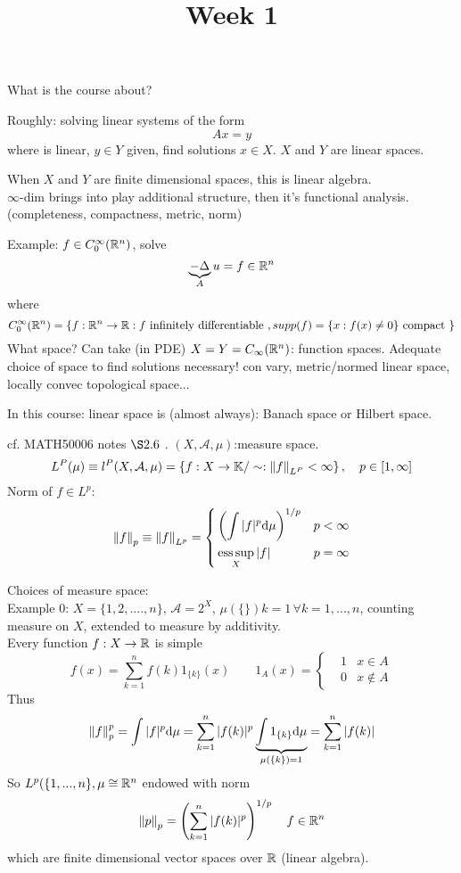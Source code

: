 \documentclass{article}
\title{Week 1}
\author{\aut}
\begin{document}
\maketitle

What is the course about?

Roughly: solving linear systems of the form 
$$Ax=y$$  
where  is linear, $y\in Y$ given, find solutions $x\in X$. $X$ and $Y$ are linear spaces.
\begin{remark}
    When $X$ and $Y$ are finite dimensional spaces, this is linear algebra.\\
    $\infty$-dim brings into play additional structure, then it's functional analysis. (completeness, compactness, metric, norm)
\end{remark}


Example: $f\in C_0^\infty (\mathbb{R}^n)$, solve
$$
\underbrace{-\Delta}_A u=f\in\mathbb{R}^n
$$where
$$
C_0^\infty(\mathbb{R}^n)=\left\{
f:\mathbb{R}^n\to\mathbb{R}:f\text{ infinitely differentiable }, supp(f)=\{x:f(x)\neq0\} \text{ compact }
\right\}
$$
What space?
Can take (in PDE) $X=Y=C_\infty(\mathbb{R}^n)$: function spaces.
Adequate choice of space to find solutions necessary!
con vary, metric/normed linear space, locally convec topological space...

In this course: linear space is (almost always): Banach space or Hilbert space.
\begin{example}
cf. MATH50006 notes $\S2.6$ .
$(X,\mathcal{A},\mu)$:measure space.
$$
L^P(\mu)\equiv l^P(X,\mathcal{A},\mu)=
\left\{
f:X\to\mathbb{K}/\sim:\left\|{f}\right\|_{L^P}<\infty
\right\},\quad p\in[1,\infty]
$$
Norm of $f\in L^p$:
$$
\left\|{f}\right\|_p\equiv\left\|{f}\right\|_{L^p}=
\left\{
\begin{aligned}
    &\left(\int|f|^p{\rm d}\mu\right)^{1/p} &p<
    \infty\\
    & \operatorname*{ess\,sup}_X |f| &p=\infty
\end{aligned}\right.
$$
\end{example}


Choices of measure space:\\
Example 0: $X=\{1,2,....,n\}$, $\mathcal{A}=2^X$, $\mu(\{\})k=1\,\forall k=1,...,n$, counting measure on $X$, extended to measure by additivity.\\
Every function $f:X\to\mathbb{R}$ is simple
$$
f(x)=\sum^n_{k=1}f(k)1_{\{k\}}(x)\qquad 1_A(x)=
\left\{\begin{aligned}
    &1 &x\in A\\
    &0 &x\notin A
\end{aligned}\right.
$$
Thus
$$
\left\|{f}\right\|_p^p=\int|f|^p{\rm d}\mu=\sum_{k=1}^n|f(k)|^p
\underbrace{\int1_{\{k\}}{\rm d}\mu}_{\mu(\{k\})=1}
=\sum_{k=1}^n|f(k)|
$$
So $L^p(\{1,...,n\},\mu\cong\mathbb{R}^n$ endowed with norm 
$$
\left\|{p}\right\|_p=\left(\sum_{k=1}^n|f(k)|^p\right)^{1/p}\quad f\in\mathbb{R}^n
$$
which are finite dimensional vector spaces over $\mathbb{R}$ (linear algebra).
\end{document}
